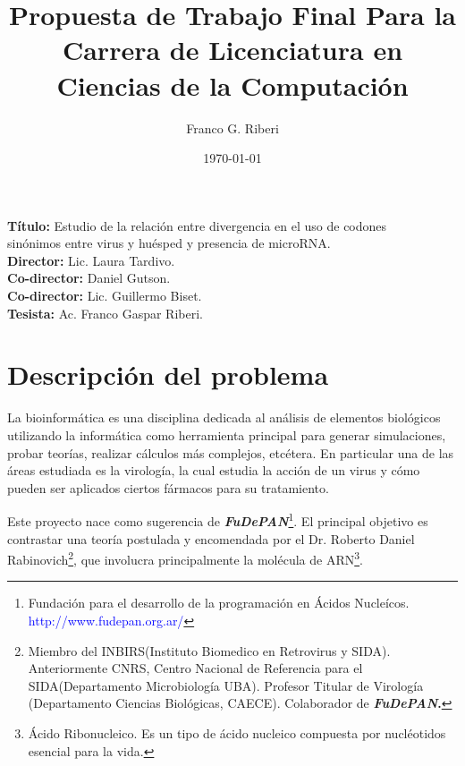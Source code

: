 \documentclass[12pt,a4paper]{article}
\begin{document}
 

\title{Propuesta de Trabajo Final Para la Carrera de Licenciatura en Ciencias de la Computación}
		\vskip 2cm
\author{Franco G. Riberi}
		\vskip 2cm
\date{\today} 	

\maketitle

\noindent \textbf{Título:} Estudio de la relación entre divergencia en el uso de codones \\
sinónimos entre virus y huésped y presencia de microRNA. \\
\vskip 0.01cm
\noindent \textbf{Director:} Lic. Laura Tardivo.\\ 
\vskip 0.01cm
\noindent \textbf{Co-director:}  Daniel Gutson.\\
\vskip 0.01cm
\noindent \textbf{Co-director:} Lic. Guillermo Biset.\\
\vskip 0.01cm
\noindent \textbf{Tesista:} Ac. Franco Gaspar Riberi. \\

\section{Descripción del problema}

\par La bioinformática es una disciplina dedicada al análisis de elementos biológicos utilizando la
informática como herramienta principal para generar simulaciones, probar teorías,  realizar cálculos más complejos, etcétera. En particular una de las áreas estudiada es la virología, la cual estudia la acción de un virus y cómo pueden ser aplicados ciertos fármacos para su tratamiento. 

\par Este proyecto nace como sugerencia de \textbf{\textit{FuDePAN}}\footnote{Fundación para el desarrollo de la programación en Ácidos Nucleícos. \textcolor{blue}{http://www.fudepan.org.ar/}}. El principal objetivo es contrastar una teoría postulada y encomendada por el Dr. Roberto Daniel Rabinovich\footnote{Miembro del INBIRS(Instituto Biomedico en Retrovirus y SIDA). Anteriormente CNRS, Centro Nacional de Referencia para el SIDA(Departamento Microbiología UBA). Profesor Titular de Virología (Departamento Ciencias Biológicas, CAECE). Colaborador de \textbf{\textit{FuDePAN}.}}, que involucra principalmente la molécula de ARN\footnote{Ácido Ribonucleico. Es un tipo de ácido nucleico compuesta por nucléotidos esencial para la vida.}.
\end{document}
